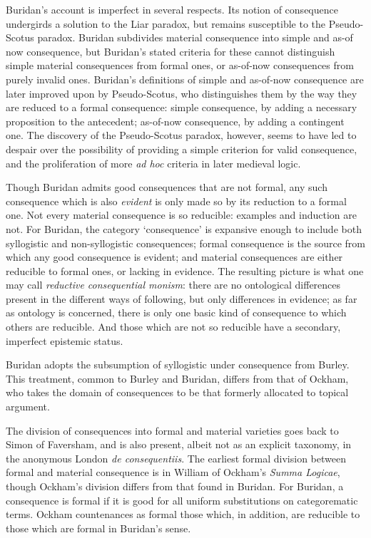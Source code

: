 Buridan's account is imperfect in several respects. Its notion of consequence undergirds a solution to the Liar paradox, but remains susceptible to the Pseudo-Scotus paradox. Buridan subdivides material consequence into simple and as-of now consequence, but Buridan's stated criteria for these cannot distinguish simple material consequences from formal ones, or as-of-now consequences from purely invalid ones. Buridan's definitions of simple and as-of-now consequence are later improved upon by Pseudo-Scotus, who distinguishes them by the way they are reduced to a formal consequence: simple consequence, by adding a necessary proposition to the antecedent; as-of-now consequence, by adding a contingent one. The discovery of the Pseudo-Scotus paradox, however, seems to have led to despair over the possibility of providing a simple criterion for valid consequence, and the proliferation of more \textit{ad hoc} criteria in later medieval logic.

Though Buridan admits good consequences that are not formal, any such consequence which is also \textit{evident} is only made so by its reduction to a formal one. Not every material consequence is so reducible: examples and induction are not. For Buridan, the category `consequence' is expansive enough to include both syllogistic and non-syllogistic consequences; formal consequence is the source from which any good consequence is evident; and material consequences are either reducible to formal ones, or lacking in evidence. The resulting picture is what one may call \textit{reductive consequential monism}: there are no ontological differences present in the different ways of following, but only differences in evidence; as far as ontology is concerned, there is only one basic kind of consequence to which others are reducible. And those which are not so reducible have a secondary, imperfect epistemic status.

Buridan adopts the subsumption of syllogistic under consequence from Burley. This treatment, common to Burley and Buridan, differs from that of Ockham, who takes the domain of consequences to be that formerly allocated to topical argument. 

The division of consequences into formal and material varieties goes back to Simon of Faversham, and is also present, albeit not as an explicit taxonomy, in the anonymous London \textit{de consequentiis}. The earliest formal division between formal and material consequence is in William of Ockham's \textit{Summa Logicae}, though Ockham's division differs from that found in Buridan. For Buridan, a consequence is formal if it is good for all uniform substitutions on categorematic terms. Ockham countenances as formal those which, in addition, are reducible to those which are formal in Buridan's sense. 

